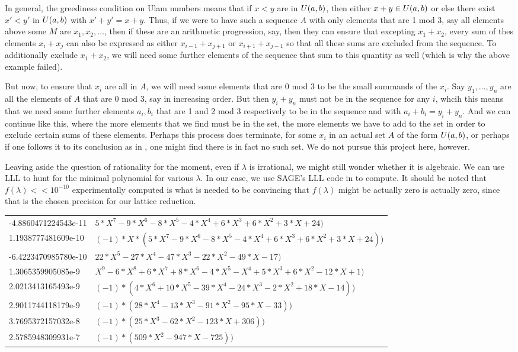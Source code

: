 \documentclass{article}
\theoremstyle{definition}
\theoremstyle{remark}
\numberwithin{equation}{section}
\begin{document}
In general, the greediness condition on Ulam numbers means that if
$x < y$ are in $U(a,b)$, then either $x+y \in U(a,b)$ or
else there exist $x' < y'$ in $U(a,b)$ with $x'+y' = x+y$.  Thus,
if we were to have such a sequence $A$ with only elements that are 1
mod 3, say all elements above some $M$ are $x_1, x_2, \ldots$, then if
these are an arithmetic progression, say, then they can ensure that
excepting $x_1 + x_2$, every sum of thes elements $x_i + x_j$ can also
be expressed as either $x_{i-1} + x_{j+1}$ or $x_{i+1}+x_{j-1}$ so
that all these sums are excluded from the sequence.  To additionally
exclude $x_1 + x_2$, we will need some further elements of the
sequence that sum to this quantity as well (which is why the above
example failed).

But now, to ensure that $x_i$ are all in $A$, we will need some
elements that are 0 mod 3 to be the small summands of the $x_i$.  Say
$y_1, \ldots, y_n$ are all the elements of $A$ that are 0 mod 3, say
in increasing order.  But then $y_i + y_n$ must not be in the sequence
for any $i$, whcih this means that we need some further elements
$a_i, b_i$ that are 1 and 2 mod 3 respectively to be in the sequence
and with $a_i+b_i = y_i + y_n$.  And we can continue like this, where
the more elements that we find must be in the set, the more elements
we have to add to the set in order to exclude certain sums of these
elements.  Perhaps this process does terminate, for some $x_i$ in an
actual set $A$ of the form $U(a,b)$, or perhaps if one follows it
to its conclusion as in \cite{schmerl:jct1994}, one might find
there is in fact no such set.  We do not pursue this project here,
however.  

Leaving aside the question of rationality for the moment, even if
$\lambda$ is irrational, we might still wonder whether it is
algebraic.  We can use LLL to hunt for the minimal polynomial for
various $\lambda$.  In our case, we use SAGE's LLL code in
 to compute.  It should be noted that
$f(\lambda) << 10^{-10}$ experimentally computed is what is needed to
be convincing that $f(\lambda)$ might be actually zero is actually
zero, since that is the chosen precision for our lattice reduction.

\begin{tabular}{ll}
-4.8860471224543e-11 & $5*X^7 - 9*X^6 - 8*X^5 - 4*X^4 + 6*X^3 + 6*X^2 + 3*X + 24)$\\
1.1938777481609e-10 & $(-1) * X * (5*X^7 - 9*X^6 - 8*X^5 - 4*X^4 + 6*X^3 + 6*X^2 + 3*X + 24))$\\
-6.4223470985780e-10 & $22*X^5 - 27*X^4 - 47*X^3 - 22*X^2 - 49*X - 17)$\\
1.3065359905085e-9 & $X^9 - 6*X^8 + 6*X^7 + 8*X^6 - 4*X^5 - X^4 + 5*X^3 + 6*X^2 - 12*X + 1)$\\
2.0213413165493e-9 & $(-1) * (4*X^6 + 10*X^5 - 39*X^4 - 24*X^3 - 2*X^2 + 18*X - 14))$\\
2.9011744118179e-9 & $(-1) * (28*X^4 - 13*X^3 - 91*X^2 - 95*X - 33))$\\
3.7695372157032e-8 & $(-1) * (25*X^3 - 62*X^2 - 123*X + 306))$\\
2.5785948309931e-7 & $(-1) * (509*X^2 - 947*X - 725))$
\end{tabular}
\end{document}
